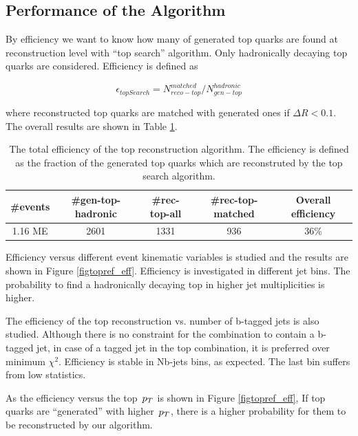 \subsection{Performance of the Algorithm}
By efficiency we want to know how many of generated top quarks are found at reconstruction level with “top search” algorithm. Only hadronically decaying top quarks are considered. Efficiency is defined as 

$$\epsilon_{topSearch} = N_{reco-top}^{matched}  / N_{gen-top}^{hadronic}$$

where reconstructed top quarks are matched with generated ones if $\Delta R < 0.1$. The overall results are shown in Table \ref{tbltopreceff}.

\begin{table}[htb]
  \begin{center}
    \begin{tabular}{|c|c|c|c|c|}
      \hline
      \textbf{\#events}  &  \textbf{\#gen-top-hadronic}  &  \textbf{\#rec-top-all}  &  \textbf{\#rec-top-matched}  &  \textbf{Overall efficiency}  \\
      \hline
      1.16 ME          &                        2601  &                   1331  &                   936  &  36\%                  \\
      \hline
    \end{tabular}
    \caption{The total efficiency of the top reconstruction algorithm. The efficiency is defined as the fraction of the generated top quarks which are reconstruted by the top search algorithm.}
    \label{tbltopreceff}
  \end{center}
\end{table}

Efficiency versus different event kinematic variables is studied and the results are shown in Figure \ref{figtopref_eff}. Efficiency is investigated in different jet bins. The probability to find a hadronically decaying top in higher jet multiplicities is higher.

The efficiency of the top reconstruction vs. number of b-tagged jets is also studied. Although there is no constraint for the combination to contain a b-tagged jet, in case of a tagged jet in the top combination, it is preferred over minimum $\chi^2$. Efficiency is stable in Nb-jets bins, as expected. The last bin suffers from low statistics.

As the efficiency versus the top $\,p_T$ is shown in Figure \ref{figtopref_eff}, If top quarks are “generated” with higher $\,p_T$, there is a higher probability for them to be reconstructed by our algorithm.

